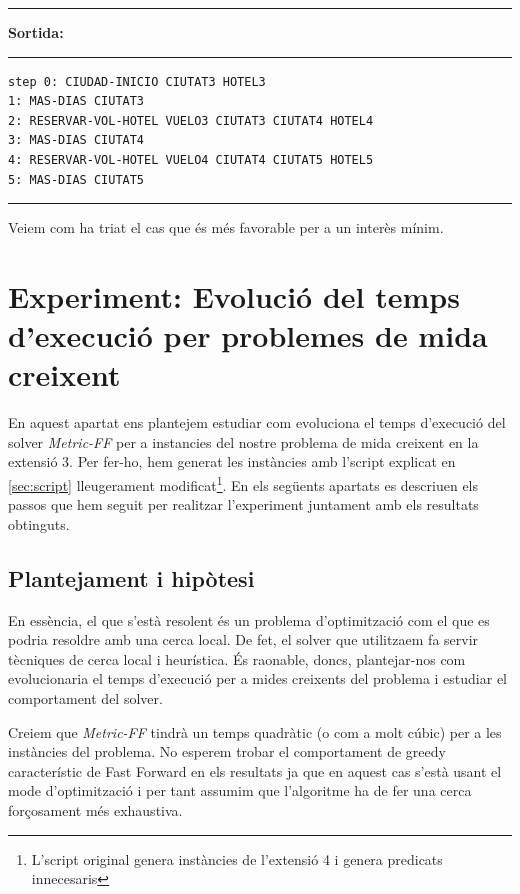 \documentclass[11pt,a4paper]{article}
\begin{document}
\begin{samepage}
\medskip
\noindent
\rule{0.1\textwidth}{0.5mm}
\textbf{Sortida:}
\rule{0.76\textwidth}{0.5mm}
\begin{verbatim}
step 0: CIUDAD-INICIO CIUTAT3 HOTEL3
1: MAS-DIAS CIUTAT3
2: RESERVAR-VOL-HOTEL VUELO3 CIUTAT3 CIUTAT4 HOTEL4
3: MAS-DIAS CIUTAT4
4: RESERVAR-VOL-HOTEL VUELO4 CIUTAT4 CIUTAT5 HOTEL5
5: MAS-DIAS CIUTAT5
\end{verbatim}
\rule{\textwidth}{0.5mm}
\medskip
\end{samepage}

Veiem com ha triat el cas que és més favorable per a un interès mínim.

\clearpage

\section[Experiment extra]{Experiment: Evolució del temps d'execució per problemes de mida creixent}
\label{sec:experiment}

En aquest apartat ens plantejem estudiar com evoluciona el temps d'execució del solver \emph{Metric-FF} per a instancies del nostre problema de mida creixent en la extensió 3. Per fer-ho, hem generat les instàncies amb l'script explicat en \ref{sec:script} lleugerament modificat\footnote{L'script original genera instàncies de l'extensió 4 i genera predicats innecesaris}. En els següents apartats es descriuen els passos que hem seguit per realitzar l'experiment juntament amb els resultats obtinguts.

\subsection{Plantejament i hipòtesi}

En essència, el que s'està resolent és un problema d'optimització com el que es podria resoldre amb una cerca local. De fet, el solver que utilitzaem fa servir tècniques de cerca local i heurística. És raonable, doncs, plantejar-nos com evolucionaria el temps d'execució per a mides creixents del problema i estudiar el comportament del solver. 

Creiem que \emph{Metric-FF} tindrà un temps quadràtic (o com a molt cúbic) per a les instàncies del problema. No esperem trobar el comportament de greedy característic de Fast Forward en els resultats ja que en aquest cas s'està usant el mode d'optimització i per tant assumim que l'algoritme ha de fer una cerca forçosament més exhaustiva.
\end{document}
